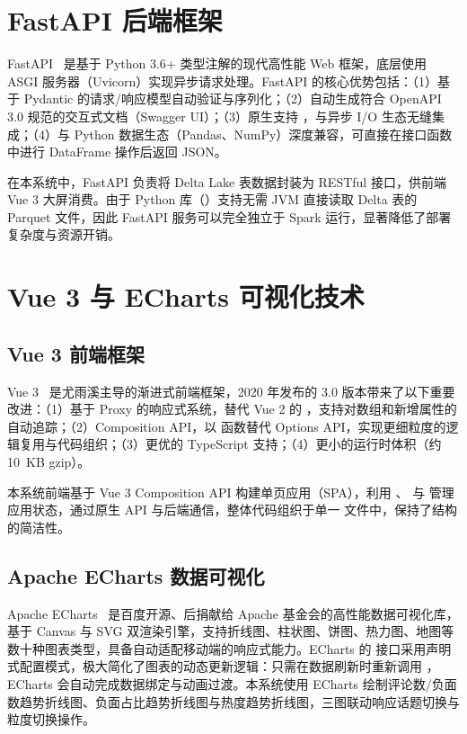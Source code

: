 \section{FastAPI 后端框架}

FastAPI~\cite{fastapi2019} 是基于 Python 3.6+ 类型注解的现代高性能 Web 框架，底层使用 ASGI 服务器（Uvicorn）实现异步请求处理。FastAPI 的核心优势包括：（1）基于 Pydantic 的请求/响应模型自动验证与序列化；（2）自动生成符合 OpenAPI 3.0 规范的交互式文档（Swagger UI）；（3）原生支持 ，与异步 I/O 生态无缝集成；（4）与 Python 数据生态（Pandas、NumPy）深度兼容，可直接在接口函数中进行 DataFrame 操作后返回 JSON。

在本系统中，FastAPI 负责将 Delta Lake 表数据封装为 RESTful 接口，供前端 Vue 3 大屏消费。由于  Python 库（）支持无需 JVM 直接读取 Delta 表的 Parquet 文件，因此 FastAPI 服务可以完全独立于 Spark 运行，显著降低了部署复杂度与资源开销。

\section{Vue 3 与 ECharts 可视化技术}

\subsection{Vue 3 前端框架}

Vue 3~\cite{vue3} 是尤雨溪主导的渐进式前端框架，2020 年发布的 3.0 版本带来了以下重要改进：（1）基于 Proxy 的响应式系统，替代 Vue 2 的 ，支持对数组和新增属性的自动追踪；（2）Composition API，以  函数替代 Options API，实现更细粒度的逻辑复用与代码组织；（3）更优的 TypeScript 支持；（4）更小的运行时体积（约 10~KB gzip）。

本系统前端基于 Vue 3 Composition API 构建单页应用（SPA），利用 、 与  管理应用状态，通过原生  API 与后端通信，整体代码组织于单一  文件中，保持了结构的简洁性。

\subsection{Apache ECharts 数据可视化}

Apache ECharts~\cite{echarts} 是百度开源、后捐献给 Apache 基金会的高性能数据可视化库，基于 Canvas 与 SVG 双渲染引擎，支持折线图、柱状图、饼图、热力图、地图等数十种图表类型，具备自动适配移动端的响应式能力。ECharts 的  接口采用声明式配置模式，极大简化了图表的动态更新逻辑：只需在数据刷新时重新调用 ，ECharts 会自动完成数据绑定与动画过渡。本系统使用 ECharts 绘制评论数/负面数趋势折线图、负面占比趋势折线图与热度趋势折线图，三图联动响应话题切换与粒度切换操作。

